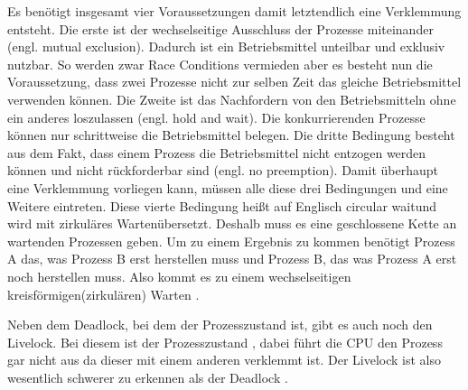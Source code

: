 Es benötigt insgesamt vier Voraussetzungen damit letztendlich eine Verklemmung entsteht. Die erste ist der wechselseitige Ausschluss der Prozesse miteinander (engl. mutual exclusion). Dadurch ist ein Betriebsmittel unteilbar und exklusiv nutzbar. So werden zwar Race Conditions vermieden aber es besteht nun die Voraussetzung, dass zwei Prozesse nicht zur selben Zeit das gleiche Betriebsmittel verwenden können. Die Zweite ist das Nachfordern von den Betriebsmitteln ohne ein anderes loszulassen (engl. hold and wait). Die konkurrierenden Prozesse können nur schrittweise die Betriebsmittel belegen. Die dritte Bedingung besteht aus dem Fakt, dass einem Prozess die Betriebsmittel nicht entzogen werden können und nicht rückforderbar sind (engl. no preemption). Damit überhaupt eine Verklemmung vorliegen kann, müssen alle diese drei Bedingungen und eine Weitere eintreten. Diese vierte Bedingung heißt auf Englisch \grqq circular wait\grqq und wird mit \glqq zirkuläres Warten\grqq übersetzt. Deshalb muss es eine geschlossene Kette an wartenden Prozessen geben. Um zu einem Ergebnis zu kommen benötigt Prozess A das, was Prozess B erst herstellen muss und Prozess B, das was Prozess A erst noch herstellen muss. Also kommt es zu einem wechselseitigen kreisförmigen(zirkulären) Warten \parencite[vgl.][S. 195f.]{baun2017}.

Neben dem Deadlock, bei dem der Prozesszustand   ist, gibt es auch noch den Livelock. Bei diesem ist der Prozesszustand , dabei führt die CPU den Prozess gar nicht aus da dieser mit einem anderen verklemmt ist. Der Livelock ist also wesentlich schwerer zu erkennen als der Deadlock \parencite[vgl.][S. 561 f.]{tanenbaum2016}.